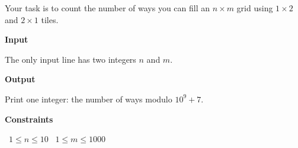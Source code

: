 Your task is to count the number of ways you can fill an $n \times m$ grid using $1 \times 2$ and $2 \times 1$ tiles.

\vspace{0.3cm}\noindent\textbf{Input}

The only input line has two integers $n$ and $m$.

\vspace{0.3cm}\noindent\textbf{Output}

Print one integer: the number of ways modulo $10^9+7$.

\vspace{0.3cm}\noindent\textbf{Constraints}

\textbullet\ $1 \le n \le 10$
\textbullet\ $1 \le m \le 1000$